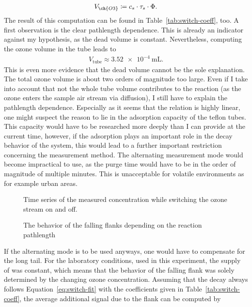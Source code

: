 \begin{align*}
  V_{\ch{O3}} \coloneqq  c_s \cdot \tau_s \cdot \Phi.
\end{align*}
The result of this computation can be found in
Table~\ref{tab:switch-coeff}, too. A first observation is the clear
pathlength dependence. This is already an indicator against my
hypothesis, as the dead volume is constant. Nevertheless, computing
the ozone volume in the tube leads to
\begin{align*}
  V_{\text{tube}} \approx \SI{3.52e-4}{\milli\liter}.
\end{align*}
This is even more evidence that the dead volume cannot be the sole
explanation. The total ozone volume is about two orders of magnitude
too large. Even if I take into account that not the whole tube volume
contributes to the reaction (as the ozone enters the sample air stream
via diffusion), I still have to explain the pathlength
dependence. Especially as it seems that the relation is highly linear,
one might suspect the reason to lie in the adsorption capacity of the
teflon tubes. This capacity would have to be researched more deeply
than I can provide at the current time, however, if the adsorption
plays an important role in the decay behavior of the system, this
would lead to a further important restriction concerning the
measurement method. The alternating measurement mode would become
impractical to use, as the purge time would have to be in the order of
magnitude of multiple minutes. This is unacceptable for volatile
environments as for example urban areas.

\begin{figure}[htbp]
  \centering
  
  \caption{Time series of the measured  concentration while
    switching the ozone stream on and off.}
  \label{fig:switch}
\end{figure}
\begin{figure}[htbp]
  \centering
  
  \caption{The behavior of the falling flanks depending on the
    reaction pathlength}
  \label{fig:switch-pl}
\end{figure}

If the alternating mode is to be used anyways, one would have to
compensate for the long tail. For the laboratory conditions, used in
this experiment, the supply of  was constant, which means that
the behavior of the falling flank was solely determined by the
changing ozone concentration. Assuming that the decay always follows
Equation~\eqref{eq:switch-fit} with the coefficients given in
Table~\ref{tab:switch-coeff}, the average additional  signal
due to the flank can be computed by

